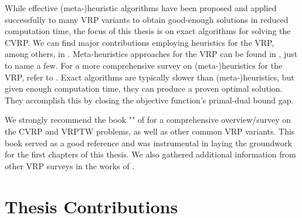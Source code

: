 While effective (meta-)heuristic algorithms have been proposed and applied
successfully to many VRP variants to obtain good-enough solutions
in reduced computation time,
the focus of this thesis is on exact algorithms for solving the CVRP.
We can find major contributions employing heuristics for the VRP, among others, in
\textcite{clarke1964, desrochers1989matching, paessens1988savings, foster1976integer}.
Meta-heuristics approaches for the VRP can be found in
\textcite{gendreau1994tabu, cordeau2012parallel, toth2003granular, li2005very, pisinger2007, kytojoki2007efficient, nagata2009,vidal2012, subramanian2013},
just to name a few.
For a more comprehensive survey on (meta-)heuristics for the VRP, refer to
\textcite{golden1998impact,gendreau2002metaheuristics,gendreau2008,laporte2014chapter,elshaer2020taxonomic}.
Exact algorithms are typically slower than (meta-)heuristics, but given
enough computation time, they can produce a proven optimal solution.
They accomplish this by closing the objective function's primal-dual bound gap.

\medskip

We strongly recommend the book  "" of \textcite{toth2014}
for a comprehensive overview/survey on the CVRP and VRPTW problems,
as well as other common VRP variants.
This book served as a good reference and was instrumental in laying the groundwork
for the first chapters of this thesis.
We also gathered additional information from other VRP surveys in the works of
\textcite{cordeau2007, baldacci2012, caceres-cruz2015, costa2019}.

\section{Thesis Contributions}
\label{sec:intro-thesis-contributions}


